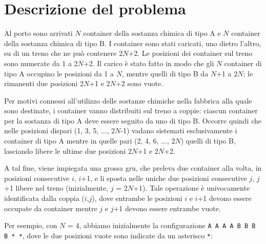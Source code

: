 \documentclass[a4paper,11pt]{article}
\begin{document}
\vspace{0.5cm}



\vspace{0.5cm}

\section*{Descrizione del problema}
   
Al porto sono arrivati $N$ container della sostanza chimica
di tipo A e $N$ container della sostanza chimica di tipo B. I
container sono stati caricati, uno dietro l'altro, su di un treno che
ne può contenere 2$N$+2. Le posizioni dei container
sul treno sono numerate da 1 a 2$N$+2. Il carico è
stato fatto in modo che gli $N$ container di tipo A occupino
le posizioni da 1 a $N$, mentre quelli di tipo B
da $N$+1 a 2$N$; le rimanenti due posizioni
2$N$+1 e 2$N$+2 sono vuote.
 
Per motivi connessi all'utilizzo delle sostanze chimiche nella
fabbrica alla quale sono destinate, i container vanno distribuiti sul
treno a coppie: ciascun container per la sostanza di tipo A deve
essere seguito da uno di tipo B.  Occorre quindi che nelle posizioni
dispari (1, 3, 5, ..., 2$N$-1) vadano sistemati
esclusivamente i container di tipo A mentre in quelle pari (2, 4, 6,
..., 2$N$) quelli di tipo B, lasciando libere le ultime due
posizioni 2$N$+1 e 2$N$+2.
 
A tal fine, viene impiegata una grossa gru, che preleva due container
alla volta, in posizioni consecutive $i$, $i$+1, e
li sposta nelle uniche due posizioni
consecutive $j$, $j$+1 libere nel treno
(inizialmente, $j$ = 2$N$+1). Tale operazione
è univocamente identificata dalla coppia
($i$,$j$), dove entrambe le posizioni $i$
e $i$+1 devono essere occupate da container
mentre $j$ e $j$+1 devono essere entrambe vuote.
 
Per esempio, con $N$ = 4, abbiamo inizialmente la
configurazione \texttt{A A A A B B B B * *},  dove le due
posizioni vuote sono indicate da un asterisco \texttt{*}:
\end{document}
